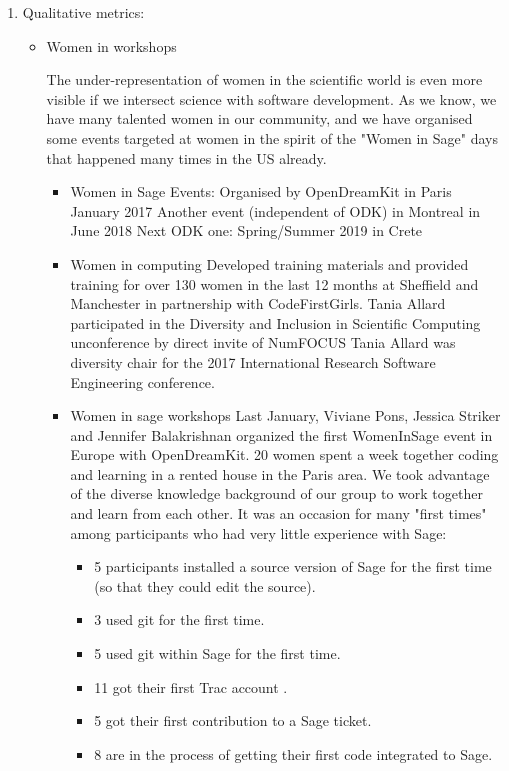 \begin{enumerate}
\item Qualitative metrics:
\begin{itemize}
\item Women in \Sage workshops

 The under-representation of women in the scientific world is even more visible if we intersect science with software
  development. As we know, we have many talented women in our community, and we have organised some events targeted at women in the
  spirit of the "Women in Sage" days that happened many times in the US already. %
\begin{itemize}
 \item Women in Sage Events:
    Organised by OpenDreamKit in Paris January 2017
    Another event (independent of ODK) in Montreal in June 2018
    Next ODK one: Spring/Summer 2019 in Crete

 \item Women in computing
    Developed training materials and provided training for over 130 women in the last 12 months at Sheffield and Manchester in partnership 
    with CodeFirstGirls.
    Tania Allard participated in the Diversity and Inclusion in Scientific Computing unconference by direct invite of NumFOCUS
    Tania Allard was diversity chair for the 2017 International Research Software Engineering conference.

 \item Women in sage workshops
    Last January, Viviane Pons, Jessica Striker and Jennifer Balakrishnan organized the first WomenInSage event in Europe with OpenDreamKit.      
    20 women spent a week together coding and learning in a rented house in the Paris area.
    We took advantage of the diverse knowledge background of our group to work together and learn from each other. It was an occasion for 
    many "first times" among participants who had very little experience with Sage:

\begin{itemize}
    \item 5 participants installed a source version of Sage for the first time (so that they could edit the source).
    \item3 used git for the first time.
    \item5 used git within Sage for the first time.
    \item11 got their first Trac account .
    \item5 got their first contribution to a Sage ticket.
    \item8 are in the process of getting their first code integrated to Sage.
\end{itemize}


\end{itemize}
\end{itemize}
\end{enumerate}
